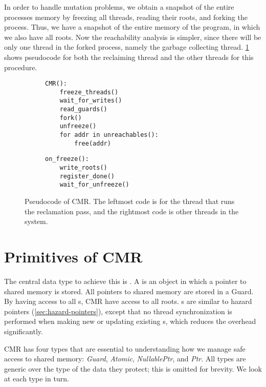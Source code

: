 In order to handle mutation problems, we obtain a snapshot of the entire processes memory by
freezing all threads, reading their roots, and forking the process. Thus, we have a snapshot of
the entire memory of the program, in which we also have all roots. Now the reachability analysis is
simpler, since there will be only one thread in the forked process, namely the garbage collecting
thread. \cref{lst:cmr} shows pseudocode for both the reclaiming thread and the other threads
for this procedure.

\begin{figure}[ht]
  \begin{subfigure}{0.45\textwidth}
    \begin{lstlisting}
CMR():
    freeze_threads()
    wait_for_writes()
    read_guards()
    fork()
    unfreeze()
    for addr in unreachables():
        free(addr)
    \end{lstlisting}
  \end{subfigure}
  \hfill
  \begin{subfigure}{0.45\textwidth}
    \begin{lstlisting}
on_freeze():
    write_roots()
    register_done()
    wait_for_unfreeze()
    \end{lstlisting}
  \end{subfigure}
  \caption{Pseudocode of CMR\@. The leftmost code is for the thread that runs the reclamation pass,
  and the rightmost code is other threads in the system.\label{lst:cmr}}
\end{figure}



\section{Primitives of CMR\label{sec:cmr-primitives}}

The central data type to achieve this is . A  is an object in which a
pointer to shared memory is stored. All pointers to shared memory are stored in a Guard. By having
access to all s, CMR have access to all roots. s are similar to hazard
pointers (\cref{sec:hazard-pointers}), except that no thread synchronization is performed
when making new or updating existing s, which reduces the overhead significantly.

CMR has four types that are essential to understanding how we manage safe access to shared memory:
\emph{Guard}, \emph{Atomic}, \emph{NullablePtr}, and \emph{Ptr}. All types are generic over the
type of the data they protect; this is omitted for brevity. We look at each type in turn.



